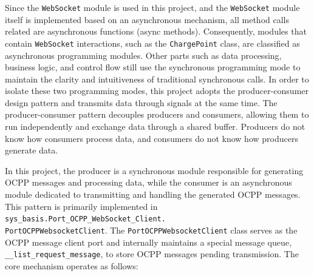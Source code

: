 \documentclass[
english,
ruledheaders=section,%
class=report,%
thesis={type=Report},%
accentcolor=9c,%
custommargins=true,%
marginpar=false,%
parskip=half-,%
fontsize=11pt,%
logofile={img/tuda_logo.pdf}, %
]{tudapub}
\begin{document}

    Since the \texttt{WebSocket} module is used in this project, and the \texttt{WebSocket} module itself is implemented based on an asynchronous mechanism, all method calls related are asynchronous functions (async methods). Consequently, modules that contain \texttt{WebSocket} interactions, such as the \texttt{ChargePoint} class, are classified as asynchronous programming modules. Other parts such as data processing, business logic, and control flow still use the synchronous programming mode to maintain the clarity and intuitiveness of traditional synchronous calls. In order to isolate these two programming modes, this project adopts the producer-consumer design pattern and transmits data through signals at the same time. The producer-consumer pattern decouples producers and consumers, allowing them to run independently and exchange data through a shared buffer. Producers do not know how consumers process data, and consumers do not know how producers generate data.


    In this project, the producer is a synchronous module responsible for generating OCPP messages and processing data, while the consumer is an asynchronous module dedicated to transmitting and handling the generated OCPP messages. This pattern is primarily implemented in \texttt{sys\_basis.Port\_OCPP\_WebSocket\_Client.\\PortOCPPWebsocketClient}. The \texttt{PortOCPPWebsocketClient} class serves as the OCPP message client port and internally maintains a special message queue,\\\texttt{\_\_list\_request\_message}, to store OCPP messages pending transmission. The core mechanism operates as follows:
\end{document}

